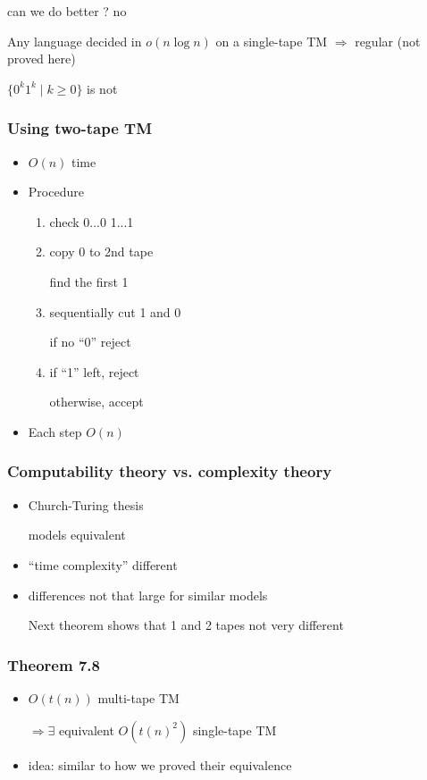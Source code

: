 \begin{frame}[allowframebreaks]
\begin{itemize}
can we do better ? no

Any language decided in $o(n\log n)$
on a single-tape TM $\Rightarrow$ regular
(not proved here)

$\{0^k1^k \mid k \geq 0\}$ is not

\end{itemize}\end{frame} \begin{frame}[allowframebreaks] \frametitle{Using two-tape TM}
  \begin{itemize}
\item $O(n)$  time
\item Procedure 
  \begin{enumerate}
  \item check 0...0 1...1

  \item copy 0 to 2nd tape

find the first 1
\item sequentially cut 1 and 0

if no ``0'' reject
\item if ``1'' left, reject

otherwise, accept
  \end{enumerate}

\item Each step $O(n)$

\end{itemize}\end{frame} \begin{frame}[allowframebreaks] \frametitle{Computability theory vs. complexity theory}
    \begin{itemize}
\item Church-Turing thesis

models equivalent
\item ``time complexity'' different
\item differences not that large for similar models

Next theorem shows that 1 and 2 tapes not very different

\end{itemize}\end{frame} \begin{frame}[allowframebreaks] \frametitle{Theorem 7.8}
  \begin{itemize}
  \item
    $O(t(n))$ multi-tape TM

$\Rightarrow \exists$ equivalent 
$O(t(n)^2)$ single-tape TM
\item idea: similar to how we proved their equivalence


\end{itemize}
\end{frame}
